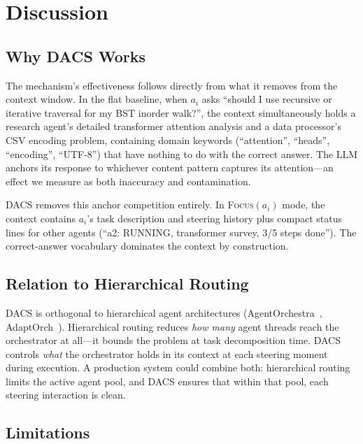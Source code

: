 \documentclass{article}
\begin{document}
\section{Discussion}
\label{sec:discussion}

\subsection{Why DACS Works}

The mechanism's effectiveness follows directly from what it removes from
the context window.
In the flat baseline, when $a_i$ asks ``should I use recursive or
iterative traversal for my BST inorder walk?'', the context simultaneously
holds a research agent's detailed transformer attention analysis and a
data processor's CSV encoding problem, containing domain keywords
(``attention'', ``heads'', ``encoding'', ``UTF-8'') that have nothing to
do with the correct answer.
The LLM anchors its response to whichever content pattern captures its
attention—an effect we measure as both inaccuracy and contamination.

DACS removes this anchor competition entirely.
In \textsc{Focus}$(a_i)$ mode, the context contains $a_i$'s task
description and steering history plus compact status lines for other
agents (``a2: RUNNING, transformer survey, 3/5 steps done'').
The correct-answer vocabulary dominates the context by construction.

\subsection{Relation to Hierarchical Routing}

DACS is orthogonal to hierarchical agent architectures
(AgentOrchestra~\citep{agentorchestra2025},
AdaptOrch~\citep{adaptorch2025b}).
Hierarchical routing reduces \emph{how many} agent threads reach the
orchestrator at all—it bounds the problem at task decomposition time.
DACS controls \emph{what} the orchestrator holds in its context at each
steering moment during execution.
A production system could combine both: hierarchical routing limits the
active agent pool, and DACS ensures that within that pool, each steering
interaction is clean.

\subsection{Limitations}
\end{document}
